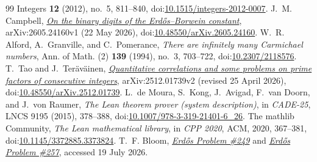 \documentclass[11pt]{article}
\theoremstyle{definition}
\theoremstyle{remark}
\begin{document}
\begin{thebibliography}{99}
  Integers \textbf{12} (2012), no.~5, 811--840,
  doi:\href{https://doi.org/10.1515/integers-2012-0007}{10.1515/integers-2012-0007}.
 J.~M. Campbell,
  \href{https://arxiv.org/abs/2605.24160v1}{\emph{On the binary digits of the
  Erd\H{o}s--Borwein constant}}, arXiv:2605.24160v1 (22 May 2026),
  doi:\href{https://doi.org/10.48550/arXiv.2605.24160}{10.48550/arXiv.2605.24160}.
 W.~R. Alford, A.~Granville, and C.~Pomerance,
  \emph{There are infinitely many Carmichael numbers}, Ann. of Math. (2)
  \textbf{139} (1994), no.~3, 703--722,
  doi:\href{https://doi.org/10.2307/2118576}{10.2307/2118576}.
 T.~Tao and J.~Ter\"av\"ainen,
  \href{https://arxiv.org/abs/2512.01739v2}{\emph{Quantitative correlations and
  some problems on prime factors of consecutive integers}}, arXiv:2512.01739v2
  (revised 25 April 2026),
  doi:\href{https://doi.org/10.48550/arXiv.2512.01739}{10.48550/arXiv.2512.01739}.
 L.~de Moura, S.~Kong, J.~Avigad, F.~van Doorn, and J.~von Raumer,
  \emph{The Lean theorem prover (system description)}, in \emph{CADE-25}, LNCS 9195
  (2015), 378--388, doi:\href{https://doi.org/10.1007/978-3-319-21401-6_26}{10.1007/978-3-319-21401-6\_26}.
 The mathlib Community, \emph{The Lean mathematical library},
  in \emph{CPP 2020}, ACM, 2020, 367--381, doi:\href{https://doi.org/10.1145/3372885.3373824}{10.1145/3372885.3373824}.
 T.~F. Bloom,
  \href{https://www.erdosproblems.com/249}{\emph{Erd\H{o}s Problem \#249}} and
  \href{https://www.erdosproblems.com/257}{\emph{Erd\H{o}s Problem \#257}}\unskip,
  accessed 19 July 2026.

\end{thebibliography}
\end{document}
